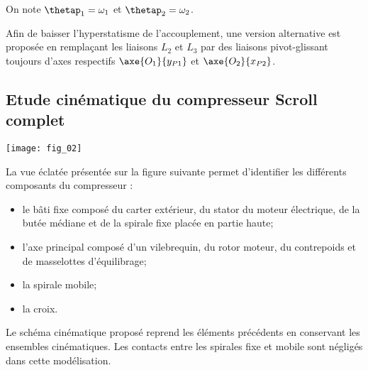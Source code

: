 On note $\thetap_1 = \omega_1$ et $\thetap_2 = \omega_2$.



Afin de baisser l’hyperstatisme de l’accouplement, une version alternative est proposée en 
remplaçant les liaisons $L_2$ et $L_3$ par des liaisons pivot-glissant toujours d’axes respectifs
$\axe{O_1}{y_{P1}}$ et $\axe{O_2}{x_{P2}}$.






\subsection*{Etude cinématique du compresseur Scroll complet}

\begin{marginfigure}[-2cm]%
\texttt{[image: fig\_02]}
\end{marginfigure}

La vue éclatée présentée sur la figure suivante permet d’identifier les différents composants du compresseur :
\begin{itemize}
\item le bâti fixe composé du carter extérieur, du stator du moteur électrique, de la butée médiane et de la spirale fixe placée en partie haute;
\item l’axe principal composé d’un vilebrequin, du rotor moteur, du contrepoids et de masselottes d’équilibrage;
\item la spirale mobile;
\item la croix.
\end{itemize}




Le schéma cinématique proposé reprend les éléments précédents en 
conservant les ensembles cinématiques.
Les contacts entre les spirales fixe et mobile sont négligés dans cette modélisation.




